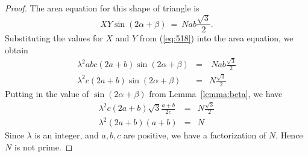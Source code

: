 \documentclass[10pt,a4paper]{amsart}
\begin{document}
\begin{proof}
The area equation for this shape of triangle is 
$$ XY \sin (2\alpha+\beta) \ = \ N ab \frac {\sqrt 3} 2.$$
Substituting the values for $X$ and $Y$ from (\ref{eq:518}) into the area equation,
we obtain
\begin{eqnarray*}
\lambda^2 abc(2a+b) \sin(2\alpha+\beta) &=& \ N ab \frac {\sqrt 3} 2  \\
\lambda^2 c(2a+b) \sin(2\alpha+\beta)  &=& N \frac {\sqrt 3} 2  
\end{eqnarray*}
Putting in the value of $\sin(2\alpha+\beta)$ from Lemma~\ref{lemma:beta}, we have
\begin{eqnarray*}
\lambda^2 c(2a+b) \sqrt 3 \frac {a+b}{2c}  &=& N \frac {\sqrt 3} 2  \\
\lambda^2 (2a+b) (a+b)  &=& N 
\end{eqnarray*}
Since $\lambda$ is an integer, and $a,b,c$ are positive, we have a factorization of $N$.
Hence $N$ is not prime.
\end{proof}
\end{document}
